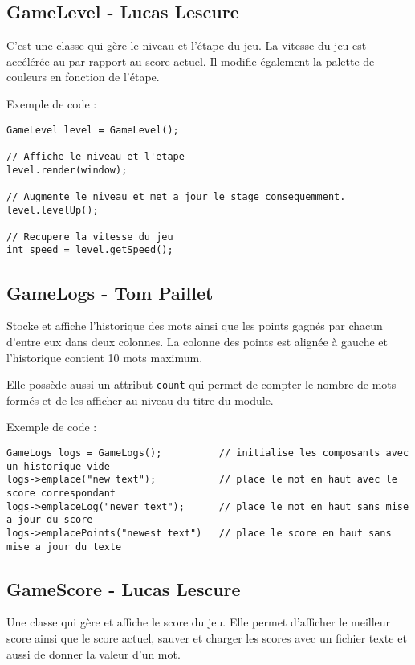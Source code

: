 \documentclass[11pt, openright]{book}
\begin{document}
     \subsection{GameLevel - Lucas Lescure}

     C'est une classe qui gère le niveau et l'étape du jeu. La vitesse du jeu est accélérée au par rapport au score actuel. Il modifie également la palette de couleurs en fonction de l'étape.

     Exemple de code :
     \begin{lstlisting}
GameLevel level = GameLevel();

// Affiche le niveau et l'etape
level.render(window);

// Augmente le niveau et met a jour le stage consequemment.
level.levelUp();

// Recupere la vitesse du jeu
int speed = level.getSpeed();
    \end{lstlisting}

     \subsection{GameLogs - Tom Paillet}

     Stocke et affiche l'historique des mots ainsi que les points gagnés par chacun d'entre eux dans deux colonnes. La colonne des points est alignée à gauche et l'historique contient 10 mots maximum.

     Elle possède aussi un attribut \texttt{count} qui permet de compter le nombre de mots formés et de les afficher au niveau du titre du module. 

     Exemple de code :
     \begin{lstlisting}
GameLogs logs = GameLogs();          // initialise les composants avec un historique vide
logs->emplace("new text");           // place le mot en haut avec le score correspondant
logs->emplaceLog("newer text");      // place le mot en haut sans mise a jour du score
logs->emplacePoints("newest text")   // place le score en haut sans mise a jour du texte
    \end{lstlisting}

     \subsection{GameScore - Lucas Lescure}

     Une classe qui gère et affiche le score du jeu. Elle permet d'afficher le meilleur score ainsi que le score actuel, sauver et charger les scores avec un fichier texte et aussi de donner la valeur d'un mot.
\end{document}
